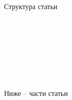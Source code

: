 



{\huge Структура статьи}

\\
\\
\\
\\
\\
\\
\\
{\huge Ниже -- части статьи}
\setcounter{section}{3}
\newpage

% 

% 









% 


